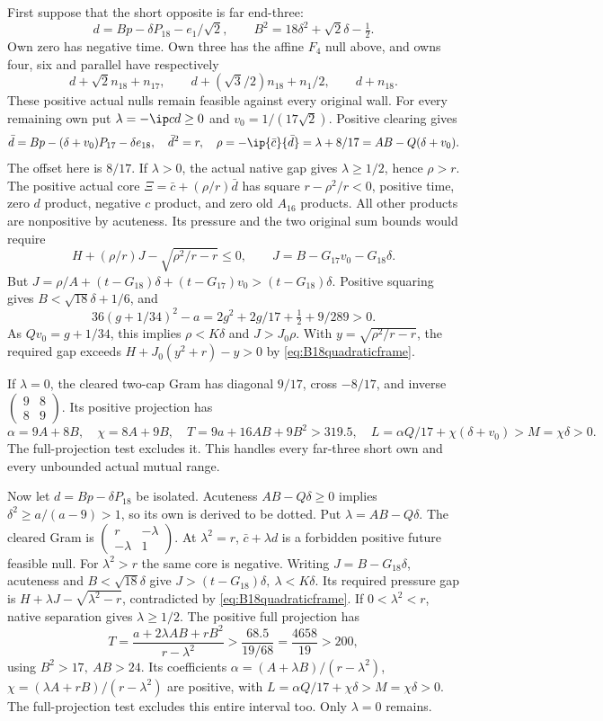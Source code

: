 First suppose that the short opposite is far end-three:
\[
 d=Bp-\delta P_{18}-e_1/\sqrt2,\qquad
 B^2=18\delta^2+\sqrt2\delta-\tfrac12 .
\]
Own zero has negative time. Own three has the affine \(F_4\)
null above, and owns four, six and parallel have respectively
\[
 d+\sqrt2n_{18}+n_{17},\qquad
 d+(\sqrt3/2)n_{18}+n_1/2,\qquad d+n_{18}.
\]
These positive actual nulls remain feasible against every original wall.
For every remaining own put \(\lambda=-\ip cd\geq0\) and
\(v_0=1/(17\sqrt2)\). Positive clearing gives
\[
 \bar d=Bp-(\delta+v_0)P_{17}-\delta e_{18},\quad
 \bar d^2=r,\quad
 \rho=-\ip{\bar c}{\bar d}=\lambda+8/17
       =AB-Q(\delta+v_0).
\]
The offset here is \(8/17\). If \(\lambda>0\), the actual native
gap gives \(\lambda\geq1/2\), hence \(\rho>r\).
The positive actual core \(\Xi=\bar c+(\rho/r)\bar d\)
has square \(r-\rho^2/r<0\), positive time, zero \(d\) product,
negative \(c\) product, and zero old \(A_{16}\) products.
All other products are nonpositive by acuteness.
Its pressure and the two original sum bounds would require
\[
 H+(\rho/r)J-\sqrt{\rho^2/r-r}\leq0,\qquad
 J=B-G_{17}v_0-G_{18}\delta .
\]
But \(J=\rho/A+(t-G_{18})\delta+(t-G_{17})v_0
>(t-G_{18})\delta\).
Positive squaring gives \(B<\sqrt{18}\delta+1/6\), and
\[
 36(g+1/34)^2-a
 =2g^2+2g/17+\tfrac12+9/289>0 .
\]
As \(Qv_0=g+1/34\), this implies \(\rho<K\delta\)
and \(J>J_0\rho\).
With \(y=\sqrt{\rho^2/r-r}\), the required gap exceeds
\(H+J_0(y^2+r)-y>0\) by \eqref{eq:B18quadraticframe}.

If \(\lambda=0\), the cleared two-cap Gram has diagonal \(9/17\),
cross \(-8/17\), and inverse
\(\left(\begin{smallmatrix}9&8\\8&9\end{smallmatrix}\right)\).
Its positive projection has
\[
 \alpha=9A+8B,\quad \chi=8A+9B,\quad
 T=9a+16AB+9B^2>319.5,\quad
 L=\alpha Q/17+\chi(\delta+v_0)>M=\chi\delta>0 .
\]
The full-projection test excludes it. This handles every far-three
short own and every unbounded actual mutual range.

Now let \(d=Bp-\delta P_{18}\) be isolated.
Acuteness \(AB-Q\delta\geq0\) implies
\(\delta^2\geq a/(a-9)>1\), so its own is derived to be dotted.
Put \(\lambda=AB-Q\delta\).
The cleared Gram is
\(\left(\begin{smallmatrix}r&-\lambda\\-\lambda&1\end{smallmatrix}\right)\).
At \(\lambda^2=r\), \(\bar c+\lambda d\) is a forbidden positive
future feasible null. For \(\lambda^2>r\) the same core is negative.
Writing \(J=B-G_{18}\delta\), acuteness and \(B<\sqrt{18}\delta\)
give \(J>(t-G_{18})\delta,\ \lambda<K\delta\).
Its required pressure gap is
\(H+\lambda J-\sqrt{\lambda^2-r}\), contradicted by
\eqref{eq:B18quadraticframe}.
If \(0<\lambda^2<r\), native separation gives \(\lambda\geq1/2\).
The positive full projection has
\[
 T=\frac{a+2\lambda AB+rB^2}{r-\lambda^2}
 >\frac{68.5}{19/68}=\frac{4658}{19}>200 ,
\]
using \(B^2>17,\ AB>24\).
Its coefficients
\(\alpha=(A+\lambda B)/(r-\lambda^2)\),
\(\chi=(\lambda A+rB)/(r-\lambda^2)\)
are positive, with \(L=\alpha Q/17+\chi\delta>M=\chi\delta>0\).
The full-projection test excludes this entire interval too.
Only \(\lambda=0\) remains.

